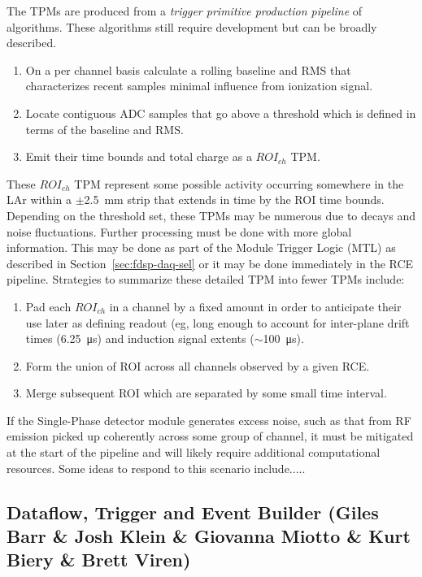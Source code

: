 The TPMs are produced from a \textit{trigger primitive production
  pipeline} of algorithms.  These algorithms still require development
but can be broadly described.   

\begin{enumerate}
\item On a per channel basis calculate a rolling baseline and RMS that
  characterizes recent samples minimal influence from ionization
  signal.
\item Locate contiguous ADC samples that go above a threshold which is
  defined in terms of the baseline and RMS.
\item Emit their time bounds and total charge as a $ROI_{ch}$ TPM.
\end{enumerate}

These $ROI_{ch}$ TPM represent some possible activity occurring
somewhere in the LAr within a $\pm$\SI{2.5}{\mm} strip that extends in
time by the ROI time bounds.  Depending on the threshold set, these
TPMs may be numerous due to  decays and noise fluctuations.
Further processing must be done with more global information.  This
may be done as part of the Module Trigger Logic (MTL) as described in
Section~\ref{sec:fdsp-daq-sel} or it may be done immediately in the
RCE pipeline.  Strategies to summarize these detailed TPM into fewer
TPMs include:

\begin{enumerate}
\item Pad each $ROI_{ch}$ in a channel by a fixed amount in order to
  anticipate their use later as defining readout (eg, long enough to
  account for inter-plane drift times (\SI{6.25}{\micro\second}) and
  induction signal extents ($\sim$\SI{100}{\micro\second}).
\item Form the union of ROI across all channels observed by a given RCE.
\item Merge subsequent ROI which are separated by some small time
  interval.
\end{enumerate}

If the Single-Phase detector module generates excess noise, such as
that from RF emission picked up coherently across some group of
channel, it must be mitigated at the start of the pipeline and will
likely require additional computational resources.  Some ideas to
respond to this scenario include.....



\subsection{Dataflow, Trigger and Event Builder (Giles Barr \& Josh Klein \& Giovanna Miotto \& Kurt Biery \& Brett Viren)}
\label{sec:fdsp-daq-hlt}

